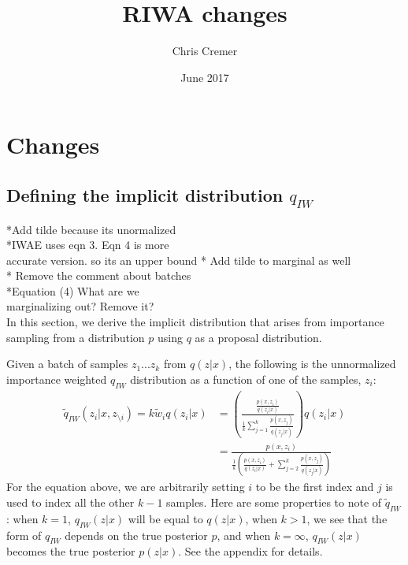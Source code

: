 \documentclass{article}
\title{RIWA changes}
\author{Chris Cremer}
\date{June 2017}
\begin{document}
\maketitle

\section{Changes}




\subsection{Defining the implicit distribution \texorpdfstring{$q_{IW}$}{}}


*Add tilde because its unormalized\\
*IWAE uses eqn 3. Eqn 4 is more\\ accurate version. so its an upper bound
* Add tilde to marginal as well\\
* Remove the comment about batches\\
*Equation (4)  What are we\\ marginalizing out? Remove it? \\




In this section, we derive the implicit distribution that arises from importance sampling from a distribution $p$ using $q$ as a proposal distribution.

Given a batch of samples $z_{1}...z_{k}$ from $q(z|x)$, the following is the unnormalized importance weighted $q_{IW}$ distribution as a function of one of the samples, $z_i$:
\begin{align} 
    \tilde{q}_{IW}(z_i|x,z_{\setminus i}) = k \tilde{w}_i q(z_i|x)
    &= \left( \frac{ \frac{p(x,z_i)}{q(z_i|x)}}{  \frac{1}{k}   \sum_{j=1}^k \frac{p(x,z_j)}{q(z_j|x)}}  \right) q(z_i|x) \\
    &= \frac{p(x,z_i)}{\frac{1}{k} \left(  \frac{p(x,z_i)}{q(z_i|x)}+ \sum_{j=2}^k \frac{p(x,z_j)}{q(z_j|x)} \right)} 
\end{align}
For the equation above, we are arbitrarily setting $i$ to be the first index and $j$ is used to index all the other $k-1$ samples. Here are some properties to note of $\tilde{q}_{IW}$:  when $k=1$, $q_{IW}(z|x)$ will be equal to $q(z|x)$, when $k > 1$, we see that the form of $q_{IW}$ depends on the true posterior $p$, and when $k=\infty$, $q_{IW}(z|x)$ becomes the true posterior $p(z|x)$. See the appendix for details.
\end{document}
